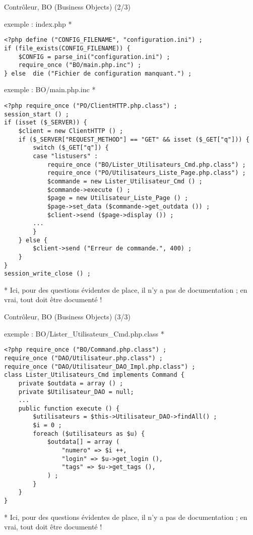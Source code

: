 \begin{frame}[containsverbatim]{Contrôleur, BO (Business Objects) (2/3)}
	\begin{block}{exemple : index.php *}
		\begin{lstlisting}
<?php define ("CONFIG_FILENAME", "configuration.ini") ;
if (file_exists(CONFIG_FILENAME)) {
	$CONFIG = parse_ini("configuration.ini") ;
	require_once ("BO/main.php.inc") ;	
} else 	die ("Fichier de configuration manquant.") ;
		\end{lstlisting}
	\end{block}
	\begin{block}{exemple : BO/main.php.inc *}
		\begin{lstlisting}
<?php require_once ("PO/ClientHTTP.php.class") ;
session_start () ;
if (isset ($_SERVER)) {
	$client = new ClientHTTP () ; 
	if ($_SERVER["REQUEST_METHOD"] == "GET" && isset ($_GET["q"])) {
		switch ($_GET["q"]) {
		case "listusers" :
			require_once ("BO/Lister_Utilisateurs_Cmd.php.class") ;
			require_once ("PO/Utilisateurs_Liste_Page.php.class") ;
			$commande = new Lister_Utilisateur_Cmd () ;
			$commande->execute () ;
			$page = new Utilisateur_Liste_Page () ;
			$page->set_data ($commande->get_outdata ()) ;
			$client->send ($page->display ()) ;
		...
		}
	} else {
		$client->send ("Erreur de commande.", 400) ;
	}
}
session_write_close () ;
		\end{lstlisting}
	\end{block}
	* Ici, pour des questions évidentes de place, il n'y a pas de documentation ; en vrai, tout doit être documenté !
\end{frame}

\begin{frame}[containsverbatim]{Contrôleur, BO (Business Objects) (3/3)}
	\begin{block}{exemple : BO/Lister\_Utilisateurs\_Cmd.php.class *}
		\begin{lstlisting}
<?php require_once ("BO/Command.php.class") ;
require_once ("DAO/Utilisateur.php.class") ;
require_once ("DAO/Utilisateur_DAO_Impl.php.class") ;
class Lister_Utilisateurs_Cmd implements Command {
	private $outdata = array () ;
	private $Utilisateur_DAO = null;
	...
	public function execute () {
		$utilisateurs = $this->Utilisateur_DAO->findAll() ;
		$i = 0 ;
		foreach ($utilisateurs as $u) {
			$outdata[] = array (
				"numero" => $i ++, 
				"login" => $u->get_login (), 
				"tags" => $u->get_tags (),
			) ; 
		}
	}
}
		\end{lstlisting}
	\end{block}
	* Ici, pour des questions évidentes de place, il n'y a pas de documentation ; en vrai, tout doit être documenté !
\end{frame}

